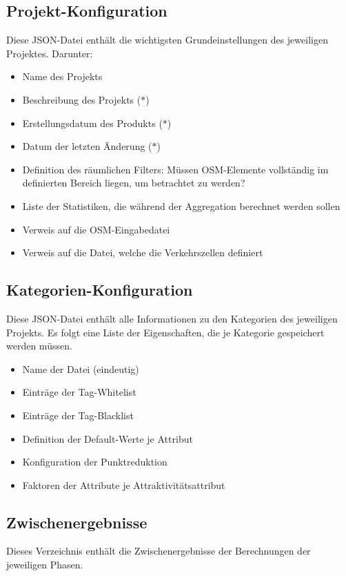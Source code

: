\documentclass[parskip=full]{scrartcl} %
\begin{document}
\subsection*{Projekt-Konfiguration}
Diese JSON-Datei enthält die wichtigsten Grundeinstellungen des jeweiligen Projektes. Darunter:
\begin{itemize}
    \item Name des Projekts
    \item Beschreibung des Projekts ($\ast$)
    \item Erstellungsdatum des Produkts ($\ast$)
    \item Datum der letzten Änderung ($\ast$)
    \item Definition des räumlichen Filters: Müssen OSM-Elemente vollständig im definierten Bereich liegen, um betrachtet zu werden?
    \item Liste der Statistiken, die während der Aggregation berechnet werden sollen
    \item Verweis auf die OSM-Eingabedatei
    \item Verweis auf die Datei, welche die Verkehrszellen definiert
\end{itemize}


\subsection*{Kategorien-Konfiguration}
Diese JSON-Datei enthält alle Informationen zu den Kategorien des jeweiligen Projekts. Es folgt eine Liste der Eigenschaften, die je Kategorie gespeichert werden müssen.
\begin{itemize}
    \item Name der Datei (eindeutig)
    \item Einträge der Tag-Whitelist
    \item Einträge der Tag-Blacklist
    \item Definition der Default-Werte je Attribut
    \item Konfiguration der Punktreduktion
    \item Faktoren der Attribute je Attraktivitätsattribut
\end{itemize}


\subsection*{Zwischenergebnisse}
Dieses Verzeichnis enthält die Zwischenergebnisse der Berechnungen der jeweiligen Phasen.
\end{document}
